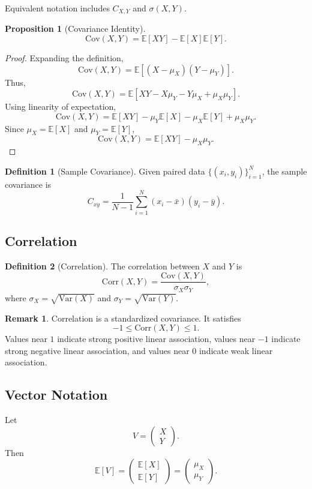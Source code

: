 \documentclass[12pt,oneside]{book}
\numberwithin{equation}{section}
\theoremstyle{definition}
\newtheorem{definition}{Definition}[section]
\newtheorem{remark}{Remark}[section]
\theoremstyle{plain}
\newtheorem{proposition}{Proposition}[section]
\theoremstyle{remark}
\newcommand{\E}{\mathbb{E}}
\newcommand{\Var}{\mathrm{Var}}
\newcommand{\Cov}{\mathrm{Cov}}
\newcommand{\Corr}{\mathrm{Corr}}
\begin{document}
Equivalent notation includes $C_{X,Y}$ and $\sigma(X,Y)$.

\begin{proposition}[Covariance Identity]
\[
\Cov(X,Y) = \E[XY] - \E[X]\E[Y].
\]
\end{proposition}

\begin{proof}
Expanding the definition,
\[
\Cov(X,Y)
=
\E[(X-\mu_X)(Y-\mu_Y)].
\]
Thus,
\[
\Cov(X,Y)
=
\E[XY - X\mu_Y - Y\mu_X + \mu_X\mu_Y].
\]
Using linearity of expectation,
\[
\Cov(X,Y)
=
\E[XY] - \mu_Y\E[X] - \mu_X\E[Y] + \mu_X\mu_Y.
\]
Since $\mu_X=\E[X]$ and $\mu_Y=\E[Y]$,
\[
\Cov(X,Y)
=
\E[XY] - \mu_X\mu_Y.
\]
\end{proof}

\begin{definition}[Sample Covariance]
Given paired data $\{(x_i,y_i)\}_{i=1}^N$, the sample covariance is
\[
C_{xy}
=
\frac{1}{N-1}\sum_{i=1}^N (x_i-\bar{x})(y_i-\bar{y}).
\]
\end{definition}

\subsection{Correlation}

\begin{definition}[Correlation]
The correlation between $X$ and $Y$ is
\[
\Corr(X,Y)
=
\frac{\Cov(X,Y)}{\sigma_X\sigma_Y},
\]
where $\sigma_X=\sqrt{\Var(X)}$ and $\sigma_Y=\sqrt{\Var(Y)}$.
\end{definition}

\begin{remark}
Correlation is a standardized covariance. It satisfies
\[
-1 \leq \Corr(X,Y) \leq 1.
\]
Values near $1$ indicate strong positive linear association, values near $-1$ indicate strong negative linear association, and values near $0$ indicate weak linear association.
\end{remark}

\subsection{Vector Notation}

Let
\[
V=
\begin{pmatrix}
X\\
Y
\end{pmatrix}.
\]
Then
\[
\E[V]
=
\begin{pmatrix}
\E[X]\\
\E[Y]
\end{pmatrix}
=
\begin{pmatrix}
\mu_X\\
\mu_Y
\end{pmatrix}.
\]
\end{document}
